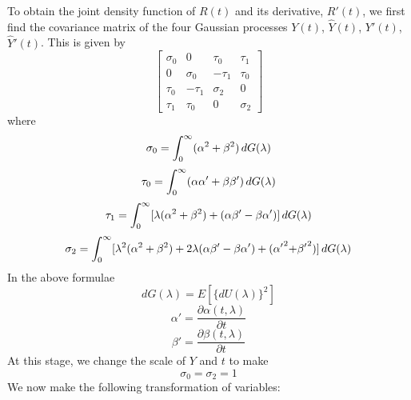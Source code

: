 \documentclass{article}
\begin{document}
To obtain the joint density function of $R (t)$ and its derivative, $R' (t)$,
we first find the covariance matrix of the four Gaussian processes $Y (t)$,
$\hat{Y} (t)$, $Y' (t)$, $\hat{Y}' (t)$. This is given by
\begin{equation}
  \label{eq:covariance_matrix} \left[ \begin{array}{cccc}
    \sigma_0 & 0 & \tau_0 & \tau_1\\
    0 & \sigma_0 & - \tau_1 & \tau_0\\
    \tau_0 & - \tau_1 & \sigma_2 & 0\\
    \tau_1 & \tau_0 & 0 & \sigma_2
  \end{array} \right]
\end{equation}
where
\begin{equation}
  \sigma_0 = \int_0^{\infty} (\alpha^2 + \beta^2)  \hspace{0.17em} dG
  (\lambda)
\end{equation}
\begin{equation}
  \tau_0 = \int_0^{\infty} (\alpha \alpha' + \beta \beta')  \hspace{0.17em} dG
  (\lambda)
\end{equation}
\begin{equation}
  \tau_1 = \int_0^{\infty} [\lambda (\alpha^2 + \beta^2) + (\alpha \beta' -
  \beta \alpha')]  \hspace{0.17em} dG (\lambda)
\end{equation}
\begin{equation}
  \sigma_2 = \int_0^{\infty} [\lambda^2 (\alpha^2 + \beta^2) + 2 \lambda
  (\alpha \beta' - \beta \alpha' {) + (\alpha'}^2 {+ \beta'}^2)] 
  \hspace{0.17em} dG (\lambda)
\end{equation}
In the above formulae
\begin{equation}
  dG (\lambda) = E [\{dU (\lambda)\}^2]
\end{equation}
\begin{equation}
  \alpha' = \frac{\partial \alpha (t, \lambda)}{\partial t}
\end{equation}
\begin{equation}
  \beta' = \frac{\partial \beta (t, \lambda)}{\partial t}
\end{equation}
At this stage, we change the scale of $Y$ and $t$ to make
\begin{equation}
  \sigma_0 = \sigma_2 = 1
\end{equation}
We now make the following transformation of variables:
\end{document}
